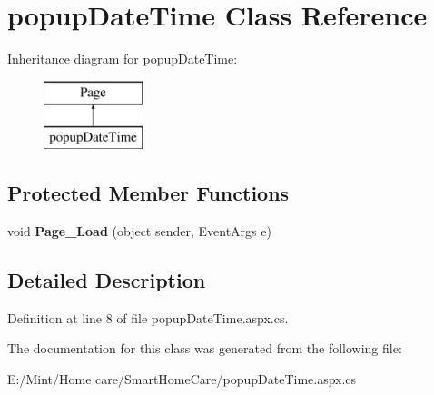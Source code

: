 \hypertarget{classpopup_date_time}{\section{popup\-Date\-Time Class Reference}
\label{classpopup_date_time}
}
Inheritance diagram for popup\-Date\-Time\-:\begin{figure}[H]
\begin{center}
\leavevmode
\includegraphics[height=2.000000cm]{classpopup_date_time}
\end{center}
\end{figure}
\subsection*{Protected Member Functions}
\begin{DoxyCompactItemize}
\item 
\hypertarget{classpopup_date_time_ae4a97a91b8649cbacfda1fcdd8e83ac1}{void {\bfseries Page\-\_\-\-Load} (object sender, Event\-Args e)}\label{classpopup_date_time_ae4a97a91b8649cbacfda1fcdd8e83ac1}

\end{DoxyCompactItemize}


\subsection{Detailed Description}


Definition at line 8 of file popup\-Date\-Time.\-aspx.\-cs.



The documentation for this class was generated from the following file\-:\begin{DoxyCompactItemize}
\item 
E\-:/\-Mint/\-Home care/\-Smart\-Home\-Care/popup\-Date\-Time.\-aspx.\-cs\end{DoxyCompactItemize}

